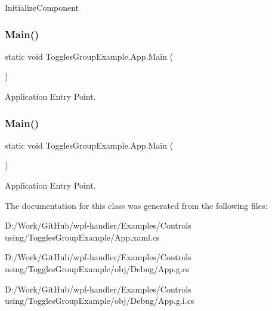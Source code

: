 Initialize\+Component 

\mbox{\label{class_toggles_group_example_1_1_app_a2ed47f800daada4ed8182995569bf206}} 
\subsubsection{\texorpdfstring{Main()}{Main()}\hspace{0.1cm}{\footnotesize\ttfamily [1/2]}}
{\footnotesize\ttfamily static void Toggles\+Group\+Example.\+App.\+Main (\begin{DoxyParamCaption}{ }\end{DoxyParamCaption})\hspace{0.3cm}{\ttfamily [static]}}



Application Entry Point. 

\mbox{\label{class_toggles_group_example_1_1_app_a2ed47f800daada4ed8182995569bf206}} 
\subsubsection{\texorpdfstring{Main()}{Main()}\hspace{0.1cm}{\footnotesize\ttfamily [2/2]}}
{\footnotesize\ttfamily static void Toggles\+Group\+Example.\+App.\+Main (\begin{DoxyParamCaption}{ }\end{DoxyParamCaption})\hspace{0.3cm}{\ttfamily [static]}}



Application Entry Point. 



The documentation for this class was generated from the following files\+:\begin{DoxyCompactItemize}
\item 
D\+:/\+Work/\+Git\+Hub/wpf-\/handler/\+Examples/\+Controls using/\+Toggles\+Group\+Example/App.\+xaml.\+cs\item 
D\+:/\+Work/\+Git\+Hub/wpf-\/handler/\+Examples/\+Controls using/\+Toggles\+Group\+Example/obj/\+Debug/App.\+g.\+cs\item 
D\+:/\+Work/\+Git\+Hub/wpf-\/handler/\+Examples/\+Controls using/\+Toggles\+Group\+Example/obj/\+Debug/App.\+g.\+i.\+cs\end{DoxyCompactItemize}
